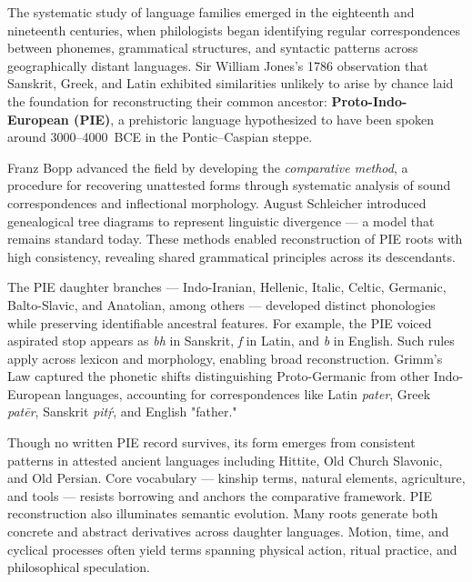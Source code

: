 \begin{historical}
    The systematic study of language families emerged in the eighteenth and nineteenth centuries, when philologists began identifying regular correspondences between phonemes, grammatical structures, and syntactic patterns across geographically distant languages. Sir William Jones's 1786 observation that Sanskrit, Greek, and Latin exhibited similarities unlikely to arise by chance laid the foundation for reconstructing their common ancestor: \textbf{Proto-Indo-European (PIE)}, a prehistoric language hypothesized to have been spoken around 3000–4000~BCE in the Pontic–Caspian steppe.

    Franz Bopp advanced the field by developing the \textit{comparative method}, a procedure for recovering unattested forms through systematic analysis of sound correspondences and inflectional morphology. August Schleicher introduced genealogical tree diagrams to represent linguistic divergence — a model that remains standard today. These methods enabled reconstruction of PIE roots with high consistency, revealing shared grammatical principles across its descendants.

    The PIE daughter branches — Indo-Iranian, Hellenic, Italic, Celtic, Germanic, Balto-Slavic, and Anatolian, among others — developed distinct phonologies while preserving identifiable ancestral features. For example, the PIE voiced aspirated stop  appears as \emph{bh} in Sanskrit, \emph{f} in Latin, and \emph{b} in English. Such rules apply across lexicon and morphology, enabling broad reconstruction. Grimm's Law captured the phonetic shifts distinguishing Proto-Germanic from other Indo-European languages, accounting for correspondences like Latin \emph{pater}, Greek \emph{patēr}, Sanskrit \emph{pitṛ́}, and English "father."
    
    Though no written PIE record survives, its form emerges from consistent patterns in attested ancient languages including Hittite, Old Church Slavonic, and Old Persian. Core vocabulary — kinship terms, natural elements, agriculture, and tools — resists borrowing and anchors the comparative framework.
    PIE reconstruction also illuminates semantic evolution. Many roots generate both concrete and abstract derivatives across daughter languages. Motion, time, and cyclical processes often yield terms spanning physical action, ritual practice, and philosophical speculation.
\end{historical}